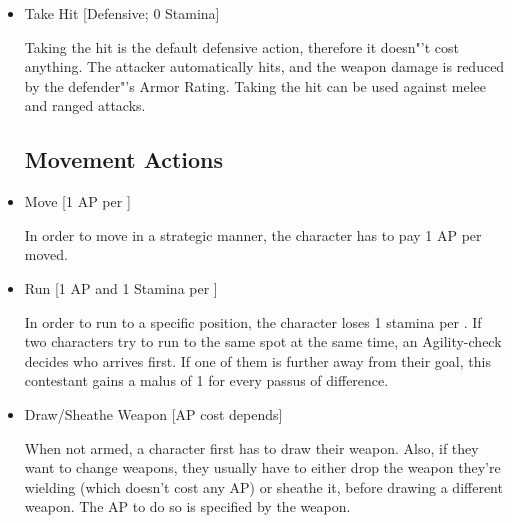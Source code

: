 \begin{itemize}
\item Take Hit [Defensive; 0 Stamina]

Taking the hit is the default defensive action, therefore it doesn"'t cost anything.
The attacker automatically hits, and the weapon damage is reduced by the defender"'s Armor Rating.
Taking the hit can be used against melee and ranged attacks.


\subsection{Movement Actions}

\item Move [1 AP per ]

In order to move in a strategic manner, the character has to pay 1 AP per  moved.


\item Run [1 AP and 1 Stamina per ]

In order to run to a specific position, the character loses 1 stamina per .
If two characters try to run to the same spot at the same time, an Agility-check decides who arrives first.
If one of them is further away from their goal, this contestant gains a malus of 1 for every passus of difference.


\item Draw/Sheathe Weapon [AP cost depends]

When not armed, a character first has to draw their weapon.
Also, if they want to change weapons, they usually have to either drop the weapon they're wielding (which doesn't cost any AP) or sheathe it, before drawing a different weapon.
The AP to do so is specified by the weapon.


\end{itemize}